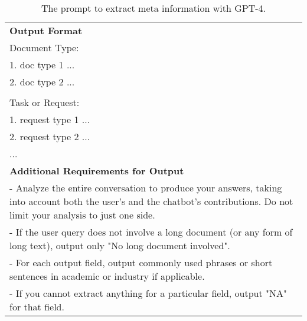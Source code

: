 \begin{table}[h!]
\begin{minipage}{\textwidth}
\begin{tcolorbox}
\begin{tabular}{p{}}
    \\ \textbf{Output Format}
        \\ Document Type:
        \\ 1. doc type 1 ...
        \\ 2. doc type 2 ...
        \\
        \\ Task or Request:
        \\ 1. request type 1 ...
        \\ 2. request type 2 ...
        \\ ...

    \\ \textbf{Additional Requirements for Output}
        \\ - Analyze the entire conversation to produce your answers, taking into account both the user's and the chatbot's contributions. Do not limit your analysis to just one side.
        \\ - If the user query does not involve a long document (or any form of long text), output only "No long document involved".
        \\ - For each output field, output commonly used phrases or short sentences in academic or industry if applicable.
        \\ - If you cannot extract anything for a particular field, output "NA" for that field.
    \end{tabular}
\end{tcolorbox}
\caption{The prompt to extract meta information with GPT-4.}
    \label{tab:prompt_extract_meta}
\end{minipage}
\end{table}




